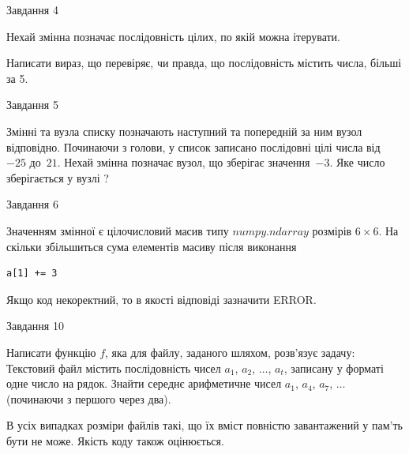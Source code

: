 \documentclass[12pt, ukrainian]{article}
\begin{document}
{\begin{minipage}[t]{8.0cm}
\end{minipage}


               
{\begin{center}Завдання {4}\end{center}}
\vspace{-4mm}
Нехай змінна  позначає послідовність цілих, по якій можна ітерувати.

Написати вираз, що перевіряє, чи правда, що послідовність  містить числа, більші за 5.\par

\vspace{10mm}
               
{\begin{center}Завдання {5}\end{center}}
\vspace{-4mm}
Змінні  та  вузла списку позначають наступний та попередній за ним вузол відповідно. Починаючи з голови, у список записано послідовні цілі числа від~$-25$ до~$21$. Нехай змінна  позначає вузол, що зберігає значення~$-3$.
Яке число зберігається у вузлі  ?\par

               
{\begin{center}Завдання {6}\end{center}}
\vspace{-4mm}
Значенням змінної  є цілочисловий масив типу $numpy.ndarray$ розмірів $6{\times}6$. На скільки збільшиться сума елементів масиву  після виконання
\begin{verbatim}
a[1] += 3
\end{verbatim}


Якщо код некоректний, то в якості відповіді зазначити ERROR.\par

               
{\begin{center}Завдання {10}\end{center}}
\vspace{-4mm}

Написати функцію $f$, яка для файлу, заданого шляхом, розв’язує задачу:\\ Текстовий файл містить послідовність чисел $a_1$, $a_2$, $\ldots$, $a_t$, записану у форматі одне число на рядок. Знайти середнє арифметичне чисел $a_1$, $a_4$, $a_7$, $\ldots$ (починаючи з першого через два).

В усіх випадках розміри файлів такі, що їх вміст повністю завантажений у пам'ть бути не може. Якість коду також оцінюється.



}
\end{document}
